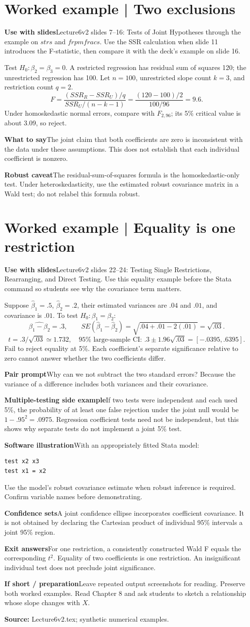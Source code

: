\documentclass[11pt,a4paper]{article}
\newcommand{\heading}[1]{\section*{\color{accent}#1}}
\newcommand{\cue}[2]{\par\noindent\textbf{#1}\quad #2\par}
\begin{document}
\heading{Worked example | Two exclusions}
\cue{Use with slides}{Lecture6v2 slides 7--16: Tests of Joint Hypotheses through the example on $strs$ and $frpmfracs$. Use the SSR calculation when slide 11 introduces the F-statistic, then compare it with the deck's example on slide 16.}
Test $H_0:\beta_2=\beta_3=0$. A restricted regression has residual sum of squares 120; the unrestricted regression has 100. Let $n=100$, unrestricted slope count $k=3$, and restriction count $q=2$.
\[
F=\frac{(SSR_R-SSR_U)/q}{SSR_U/(n-k-1)}
=\frac{(120-100)/2}{100/96}=9.6.
\]
Under homoskedastic normal errors, compare with $F_{2,96}$; its 5\% critical value is about 3.09, so reject.
\cue{What to say}{The joint claim that both coefficients are zero is inconsistent with the data under these assumptions. This does not establish that each individual coefficient is nonzero.}
\cue{Robust caveat}{The residual-sum-of-squares formula is the homoskedastic-only test. Under heteroskedasticity, use the estimated robust covariance matrix in a Wald test; do not relabel this formula robust.}

\newpage
\heading{Worked example | Equality is one restriction}
\cue{Use with slides}{Lecture6v2 slides 22--24: Testing Single Restrictions, Rearranging, and Direct Testing. Use this equality example before the Stata command so students see why the covariance term matters.}
Suppose $\hat\beta_1=.5$, $\hat\beta_2=.2$, their estimated variances are $.04$ and $.01$, and covariance is $.01$. To test $H_0:\beta_1=\beta_2$:
\[
\widehat{\beta_1-\beta_2}=.3,\qquad
SE(\hat\beta_1-\hat\beta_2)=\sqrt{.04+.01-2(.01)}=\sqrt{.03}.
\]
\[
t=.3/\sqrt{.03}\simeq1.732,\quad
95\%\text{ large-sample CI: } .3\pm1.96\sqrt{.03}
=[-.0395,.6395].
\]
Fail to reject equality at 5\%. Each coefficient's separate significance relative to zero cannot answer whether the two coefficients differ.
\cue{Pair prompt}{Why can we not subtract the two standard errors? Because the variance of a difference includes both variances and their covariance.}
\cue{Multiple-testing side example}{If two tests were independent and each used 5\%, the probability of at least one false rejection under the joint null would be $1-.95^2=.0975$. Regression coefficient tests need not be independent, but this shows why separate tests do not implement a joint 5\% test.}
\cue{Software illustration}{With an appropriately fitted Stata model:}
\begin{verbatim}
test x2 x3
test x1 = x2
\end{verbatim}
Use the model's robust covariance estimate when robust inference is required. Confirm variable names before demonstrating.
\cue{Confidence sets}{A joint confidence ellipse incorporates coefficient covariance. It is not obtained by declaring the Cartesian product of individual 95\% intervals a joint 95\% region.}
\cue{Exit answers}{For one restriction, a consistently constructed Wald F equals the corresponding $t^2$. Equality of two coefficients is one restriction. An insignificant individual test does not preclude joint significance.}
\cue{If short / preparation}{Leave repeated output screenshots for reading. Preserve both worked examples. Read Chapter 8 and ask students to sketch a relationship whose slope changes with $X$.}
\textbf{Source:} Lecture6v2.tex; synthetic numerical examples.
\end{document}
